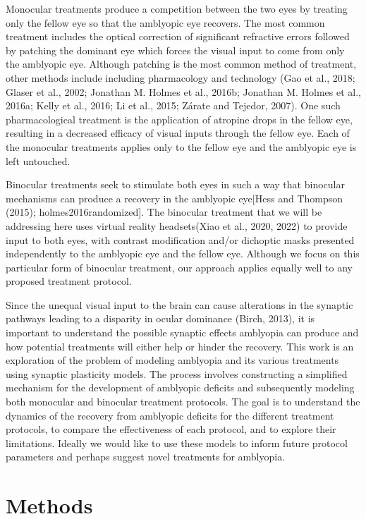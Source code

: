 \documentclass[
  onecolumn]{article}
\begin{document}
Monocular treatments produce a competition between the two eyes by
treating only the fellow eye so that the amblyopic eye recovers. The
most common treatment includes the optical correction of significant
refractive errors followed by patching the dominant eye which forces the
visual input to come from only the amblyopic eye. Although patching is
the most common method of treatment, other methods include including
pharmacology and technology (Gao et al., 2018; Glaser et al., 2002;
Jonathan M. Holmes et al., 2016b; Jonathan M. Holmes et al., 2016a;
Kelly et al., 2016; Li et al., 2015; Zárate and Tejedor, 2007). One such
pharmacological treatment is the application of atropine drops in the
fellow eye, resulting in a decreased efficacy of visual inputs through
the fellow eye. Each of the monocular treatments applies only to the
fellow eye and the amblyopic eye is left untouched.

Binocular treatments seek to stimulate both eyes in such a way that
binocular mechanisms can produce a recovery in the amblyopic eye{[}Hess
and Thompson (2015); holmes2016randomized{]}. The binocular treatment
that we will be addressing here uses virtual reality headsets(Xiao et
al., 2020, 2022) to provide input to both eyes, with contrast
modification and/or dichoptic masks presented independently to the
amblyopic eye and the fellow eye. Although we focus on this particular
form of binocular treatment, our approach applies equally well to any
proposed treatment protocol.

Since the unequal visual input to the brain can cause alterations in the
synaptic pathways leading to a disparity in ocular dominance (Birch,
2013), it is important to understand the possible synaptic effects
amblyopia can produce and how potential treatments will either help or
hinder the recovery. This work is an exploration of the problem of
modeling amblyopia and its various treatments using synaptic plasticity
models. The process involves constructing a simplified mechanism for the
development of amblyopic deficits and subsequently modeling both
monocular and binocular treatment protocols. The goal is to understand
the dynamics of the recovery from amblyopic deficits for the different
treatment protocols, to compare the effectiveness of each protocol, and
to explore their limitations. Ideally we would like to use these models
to inform future protocol parameters and perhaps suggest novel
treatments for amblyopia.

\hypertarget{methods}{%
\section{Methods}\label{methods}}
\end{document}
